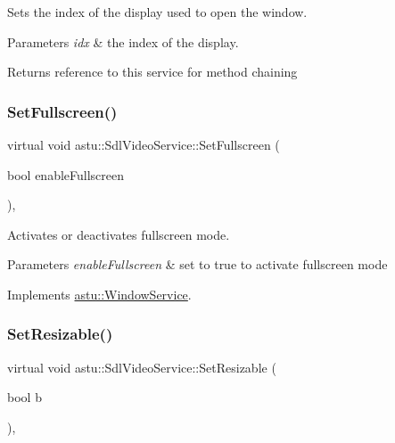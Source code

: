 Sets the index of the display used to open the window.


\begin{DoxyParams}{Parameters}
{\em idx} & the index of the display. \\
\hline
\end{DoxyParams}
\begin{DoxyReturn}{Returns}
reference to this service for method chaining 
\end{DoxyReturn}
\mbox{\label{classastu_1_1SdlVideoService_a45a37b4958f6e77e22ffa55699a171ef}} 
\subsubsection{\texorpdfstring{Set\+Fullscreen()}{SetFullscreen()}}
{\footnotesize\ttfamily virtual void astu\+::\+Sdl\+Video\+Service\+::\+Set\+Fullscreen (\begin{DoxyParamCaption}\item[{bool}]{enable\+Fullscreen }\end{DoxyParamCaption})\hspace{0.3cm}{\ttfamily [override]}, {\ttfamily [virtual]}}

Activates or deactivates fullscreen mode.


\begin{DoxyParams}{Parameters}
{\em enable\+Fullscreen} & set to {\ttfamily true} to activate fullscreen mode \\
\hline
\end{DoxyParams}


Implements \hyperlink{classastu_1_1WindowService_abe2ef0eb9f42078676318945e15d2dce}{astu\+::\+Window\+Service}.

\mbox{\label{classastu_1_1SdlVideoService_ab50969b38dedf29146704898a74df5ae}} 
\subsubsection{\texorpdfstring{Set\+Resizable()}{SetResizable()}}
{\footnotesize\ttfamily virtual void astu\+::\+Sdl\+Video\+Service\+::\+Set\+Resizable (\begin{DoxyParamCaption}\item[{bool}]{b }\end{DoxyParamCaption})\hspace{0.3cm}{\ttfamily [override]}, {\ttfamily [virtual]}}

